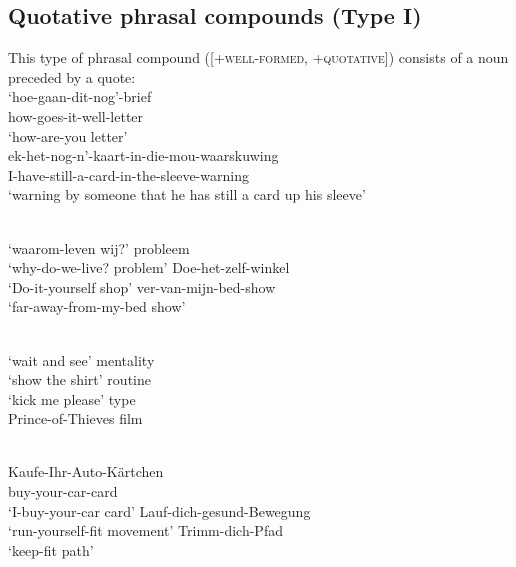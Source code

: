 \documentclass[output=paper]{LSP/langsci}
\begin{document}
\subsection{Quotative phrasal compounds (\textbf{Type I})}

This type of phrasal compound ([+\textsc{well-formed}, +\textsc{quotative}]) consists of a noun preceded by a quote:
\ea
      \ea\label{ex:pafel:1a}
      \\
      \gll `hoe-gaan-dit-nog'-brief \\
             how-goes-it-well-letter \\
      \glt  `how-are-you letter’
      \ex\label{ex:pafel:1b}
      \\
      \gll  ek-het-nog-n'-kaart-in-die-mou-waarskuwing \\
             I-have-still-a-card-in-the-sleeve-warning \\
      \glt  `warning by someone that he has still a card up his sleeve’
    \z
\z

\ea
    \\
      \ea\label{ex:pafel:2a}  
        `waarom-leven wij?' probleem  \\                                          
      \glt  `why-do-we-live? problem' 
      \ex\label{ex:pafel:2b}
         Doe-het-zelf-winkel\\                                
      \glt  `Do-it-yourself shop'
      \ex\label{ex:pafel:2c}
         ver-van-mijn-bed-show\\                                
      \glt  `far-away-from-my-bed show'
    \z
\z

\ea
      \\
      \ea\label{ex:pafel:3a}      
        `wait and see' mentality\\
      \ex\label{ex:pafel:3b}
         `show the shirt' routine\\
      \ex\label{ex:pafel:3c}
         `kick me please' type\\
      \ex\label{ex:pafel:3d}
         Prince-of-Thieves film\\
    \z
\z

\ea
      \\
      \ea\label{ex:pafel:4a}      
        Kaufe-Ihr-Auto-Kärtchen\\
            buy-your-car-card  \\
      \glt  ‘I-buy-your-car card’
      \ex\label{ex:pafel:4b}
         Lauf-dich-gesund-Bewegung \\             
      \glt  ‘run-yourself-fit movement'
      \ex\label{ex:pafel:4c}
         Trimm-dich-Pfad \\             
      \glt  ‘keep-fit path'
    \z
\z          
\end{document}
